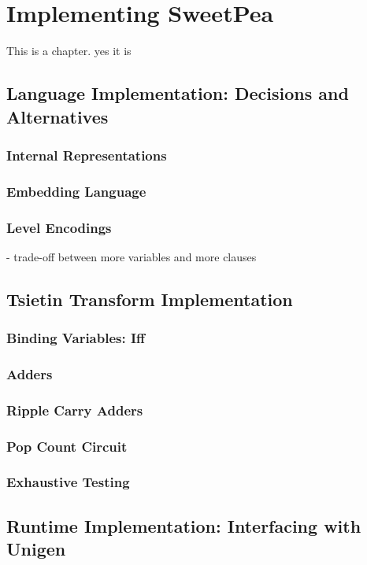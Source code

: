 
\chapter{Implementing SweetPea}

This is a chapter.
yes
it is

\section{Language Implementation: Decisions and Alternatives}
\subsection{Internal Representations}

\subsection{Embedding Language}

\subsection{Level Encodings}
- trade-off between more variables and more clauses


\section{Tsietin Transform Implementation}
\subsection{Binding Variables: Iff}
\subsection{Adders}
\subsection{Ripple Carry Adders}
\subsection{Pop Count Circuit}
\subsection{Exhaustive Testing}


\section{Runtime Implementation: Interfacing with Unigen}
